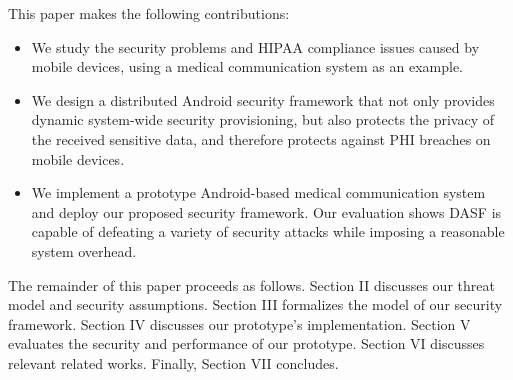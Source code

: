 This paper makes the following contributions:
\begin{itemize}
	\item We study the security problems and HIPAA compliance issues
	caused by mobile devices, using a medical communication system as an example.
	\item We design a distributed Android security framework that not only
	provides dynamic system-wide security provisioning, but also protects
	the privacy of the received sensitive data, and therefore protects against PHI
	breaches on mobile devices.
	\item We implement a prototype Android-based medical communication
	system and deploy our proposed security framework.  Our evaluation shows DASF
	is capable of defeating a variety of security attacks while imposing a
	reasonable system overhead.
\end{itemize}

The remainder of this paper proceeds as follows. Section II discusses our
threat model and security assumptions. Section III formalizes the model of our
security framework. Section IV discusses our prototype's implementation.
Section V evaluates the security and performance of our prototype.  Section VI
discusses relevant related works. Finally, Section VII concludes.


